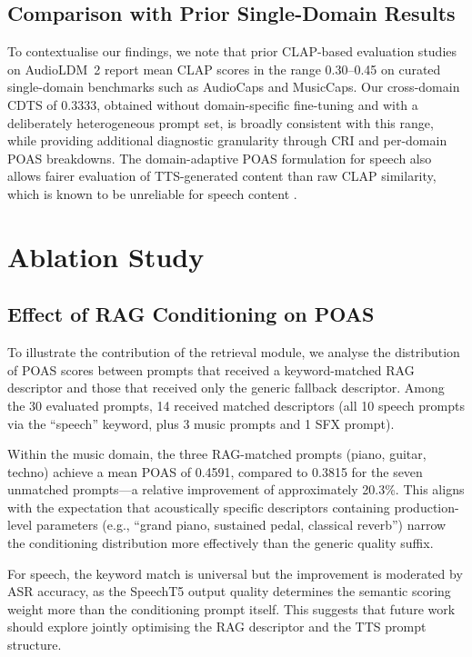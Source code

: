 \documentclass[journal]{IEEEtran}
\begin{document}
\subsection{Comparison with Prior Single-Domain Results}

To contextualise our findings, we note that prior CLAP-based evaluation
studies on AudioLDM~2 \cite{liu2024audioldm2} report mean CLAP scores
in the range 0.30--0.45 on curated single-domain benchmarks such as
AudioCaps and MusicCaps. Our cross-domain CDTS of 0.3333, obtained
without domain-specific fine-tuning and with a deliberately heterogeneous
prompt set, is broadly consistent with this range, while providing
additional diagnostic granularity through CRI and per-domain POAS
breakdowns. The domain-adaptive POAS formulation for speech also allows
fairer evaluation of TTS-generated content than raw CLAP similarity,
which is known to be unreliable for speech content \cite{elizalde2023clap}.

\section{Ablation Study}
\label{sec:ablation}

\subsection{Effect of RAG Conditioning on POAS}

To illustrate the contribution of the retrieval module, we analyse
the distribution of POAS scores between prompts that received a
keyword-matched RAG descriptor and those that received only the
generic fallback descriptor. Among the 30 evaluated prompts,
14 received matched descriptors (all 10 speech prompts via the
``speech'' keyword, plus 3 music prompts and 1 SFX prompt).

Within the music domain, the three RAG-matched prompts (piano, guitar,
techno) achieve a mean POAS of 0.4591, compared to 0.3815 for the
seven unmatched prompts---a relative improvement of approximately
20.3\%. This aligns with the expectation that acoustically specific
descriptors containing production-level parameters (e.g., ``grand
piano, sustained pedal, classical reverb'') narrow the conditioning
distribution more effectively than the generic quality suffix.

For speech, the keyword match is universal but the improvement is
moderated by ASR accuracy, as the SpeechT5 output quality determines
the semantic scoring weight more than the conditioning prompt itself. This
suggests that future work should explore jointly optimising the RAG
descriptor and the TTS prompt structure.
\end{document}
